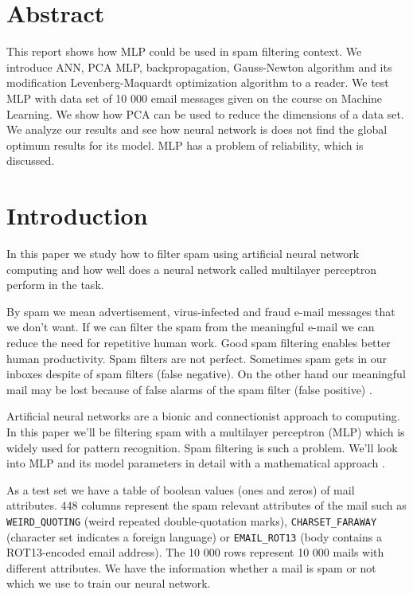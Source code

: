 
\section{Abstract}
\label{sec:abs}

This report shows how MLP could be used in spam filtering context. We introduce ANN, PCA MLP, backpropagation, Gauss-Newton algorithm and its modification Levenberg-Maquardt optimization algorithm to a reader. We test MLP with data set of 10 000 email messages given on the course on Machine Learning. We show how PCA can be used to reduce the dimensions of a data set. We analyze our results and see how neural network is does not find the global optimum results for its model. MLP has a problem of reliability, which is discussed.


\section{Introduction}
\label{sec:intro}

In this paper we study how to filter spam using artificial neural network computing and how well does a neural network called multilayer perceptron perform in the task.

By spam we mean advertisement, virus-infected and fraud e-mail messages that we don’t want. If we can filter the spam from the meaningful e-mail we can reduce the need for repetitive human work. Good spam filtering enables better human productivity. Spam filters are not perfect. Sometimes spam gets in our inboxes despite of spam filters (false negative). On the other hand our meaningful mail may be lost because of false alarms of the spam filter (false positive) \cite{wiki:email} . 

Artificial neural networks are a bionic and connectionist approach to computing. In this paper we’ll be filtering spam with a multilayer perceptron (MLP) which is widely used for pattern recognition. Spam filtering is such a problem. We’ll look into MLP and its model parameters in detail with a mathematical approach \cite{wiki:mlp} . 

As a test set we have a table of boolean values (ones and zeros) of mail attributes. 448 columns represent the spam relevant attributes of the mail such as \verb!WEIRD_QUOTING! (weird repeated double-quotation marks), \verb!CHARSET_FARAWAY! (character set indicates a foreign language) or \verb!EMAIL_ROT13! (body contains a ROT13-encoded email address). The 10 000 rows represent 10 000 mails with different attributes. We have the information whether a mail is spam or not which we use to train our neural network.

